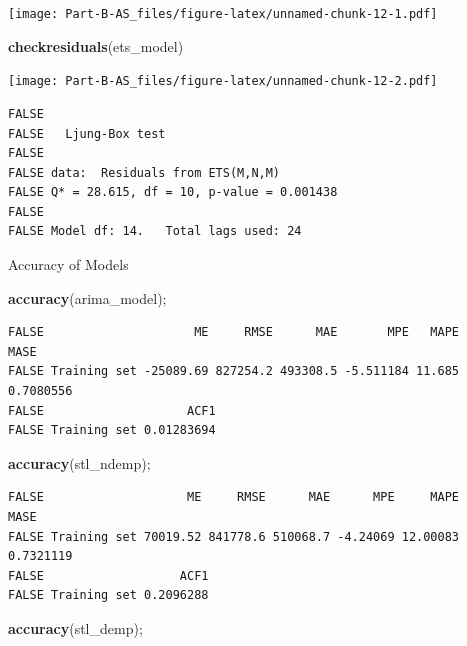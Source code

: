 \documentclass[openany]{book}
\newenvironment{Shaded}{\begin{snugshade}}{\end{snugshade}}
\newcommand{\KeywordTok}[1]{\textcolor[rgb]{0.13,0.29,0.53}{\textbf{#1}}}
\newcommand{\NormalTok}[1]{#1}
\begin{document}
\texttt{[image: Part-B-AS\_files/figure-latex/unnamed-chunk-12-1.pdf]}

\begin{Shaded}
\begin{Highlighting}[]
\KeywordTok{checkresiduals}\NormalTok{(ets_model)}
\end{Highlighting}
\end{Shaded}

\texttt{[image: Part-B-AS\_files/figure-latex/unnamed-chunk-12-2.pdf]}

\begin{verbatim}
FALSE 
FALSE   Ljung-Box test
FALSE 
FALSE data:  Residuals from ETS(M,N,M)
FALSE Q* = 28.615, df = 10, p-value = 0.001438
FALSE 
FALSE Model df: 14.   Total lags used: 24
\end{verbatim}

Accuracy of Models

\begin{Shaded}
\begin{Highlighting}[]
\KeywordTok{accuracy}\NormalTok{(arima_model);}
\end{Highlighting}
\end{Shaded}

\begin{verbatim}
FALSE                     ME     RMSE      MAE       MPE   MAPE      MASE
FALSE Training set -25089.69 827254.2 493308.5 -5.511184 11.685 0.7080556
FALSE                    ACF1
FALSE Training set 0.01283694
\end{verbatim}

\begin{Shaded}
\begin{Highlighting}[]
\KeywordTok{accuracy}\NormalTok{(stl_ndemp);}
\end{Highlighting}
\end{Shaded}

\begin{verbatim}
FALSE                    ME     RMSE      MAE      MPE     MAPE      MASE
FALSE Training set 70019.52 841778.6 510068.7 -4.24069 12.00083 0.7321119
FALSE                   ACF1
FALSE Training set 0.2096288
\end{verbatim}

\begin{Shaded}
\begin{Highlighting}[]
\KeywordTok{accuracy}\NormalTok{(stl_demp);}
\end{Highlighting}
\end{Shaded}
\end{document}
